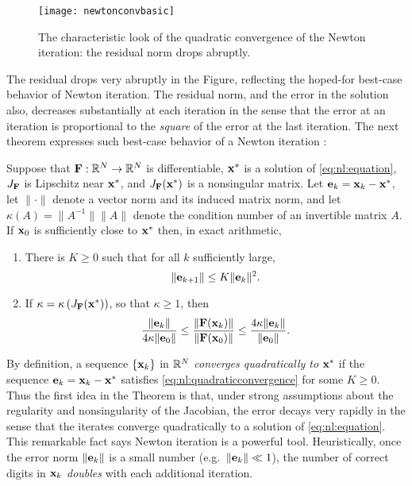 \begin{figure}
\texttt{[image: newtonconvbasic]}
\caption{The characteristic look of the quadratic convergence of the Newton iteration: the residual norm drops abruptly.}
\label{fig:newtonconvbasic}
\end{figure}

The residual drops very abruptly in the Figure, reflecting the hoped-for best-case behavior of Newton iteration.  The residual norm, and the error in the solution also, decreases substantially at each iteration in the sense that the error at an iteration is proportional to the \emph{square} of the error at the last iteration.  The next theorem expresses such best-case behavior of a Newton iteration \citep[Theorems 1.1 and inequalities (1.13)]{Kelley2003}:

\begin{theorem}
Suppose that $\mathbf{F}:\mathbb{R}^N\to\mathbb{R}^N$ is differentiable, $\mathbf{x}^*$ is a solution of \eqref{eq:nl:equation}, $J_{\mathbf{F}}$ is Lipschitz near $\mathbf{x}^*$, and $J_{\mathbf{F}}(\mathbf{x}^*)$ is a nonsingular matrix.  Let $\mathbf{e}_k=\mathbf{x}_k-\mathbf{x}^*$, let $\|\cdot\|$ denote a vector norm and its induced matrix norm, and let $\kappa(A)=\|A^{-1}\| \|A\|$ denote the condition number of an invertible matrix $A$.  If $\mathbf{x}_0$ is sufficiently close to $\mathbf{x}^*$ then, in exact arithmetic,
\renewcommand{\labelenumi}{(\roman{enumi})}
\begin{enumerate}
\item There is $K\ge 0$ such that for all $k$ sufficiently large,
\begin{equation}
	\|\mathbf{e}_{k+1}\| \le K \|\mathbf{e}_k\|^2. \label{eq:nl:quadraticconvergence}
\end{equation}
\item If $\kappa = \kappa\left(J_{\mathbf{F}}(\mathbf{x}^*)\right)$, so that $\kappa\ge 1$, then
	$$\frac{\|\mathbf{e}_k\|}{4 \kappa \|\mathbf{e}_0\|} \le \frac{\|\mathbf{F}(\mathbf{x}_k)\|}{\|\mathbf{F}(\mathbf{x}_0)\|} \le \frac{4 \kappa \|\mathbf{e}_k\|}{\|\mathbf{e}_0\|}.$$
\end{enumerate}
\end{theorem}

By definition, a sequence $\{\mathbf{x}_k\}$ in $\mathbb{R}^N$ \emph{converges quadratically to} $\mathbf{x}^*$ if the sequence $\mathbf{e}_k=\mathbf{x}_k-\mathbf{x}^*$ satisfies \eqref{eq:nl:quadraticconvergence} for some $K\ge 0$.  Thus the first idea in the Theorem is that, under strong assumptions about the regularity and nonsingularity of the Jacobian, the error decays very rapidly in the sense that the iterates converge quadratically to a solution of \eqref{eq:nl:equation}.  This remarkable fact says Newton iteration is a powerful tool.  Heuristically, once the error norm $\|\mathbf{e}_k\|$ is a small number (e.g.~$\|\mathbf{e}_k\| \ll 1$), the number of correct digits in $\mathbf{x}_k$ \emph{doubles} with each additional iteration.

